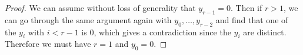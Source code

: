 \documentclass{article}
\numberwithin{equation}{section}
\begin{document}
\begin{proof}
We can assume without loss of generality that $y_{r-1}=0$. Then if $r>1$, we can go through the same argument again with $y_0,\dots,y_{r-2}$ and find that one of the $y_i$ with $i < r-1$ is $0$, which gives a contradiction since the $y_i$ are distinct. Therefore we must have $r=1$ and $y_0=0$. 






%
%
%
%
%
\end{proof}
\end{document}
